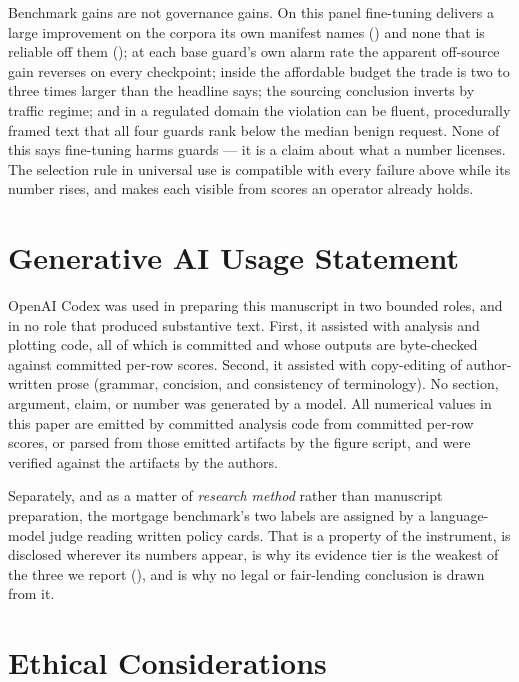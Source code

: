 \documentclass[manuscript,screen,review,anonymous]{acmart}
\begin{document}
Benchmark gains are not governance gains. On this panel fine-tuning delivers a large improvement on the
corpora its own manifest names (\RepDelta) and none that is reliable off them (\TransferDelta); at each
base guard's own alarm rate the apparent off-source gain reverses on every checkpoint; inside the
affordable budget the trade is two to three times larger than the headline says; the sourcing conclusion
inverts by traffic regime; and in a regulated domain the violation can be fluent, procedurally framed
text that all four guards rank below the median benign request. None of this says fine-tuning harms
guards --- it is a claim about what a number licenses. The selection rule in universal use is compatible
with every failure above while its number rises, and  makes each visible from scores
an operator already holds.

\clearpage
\section*{Generative AI Usage Statement}

OpenAI Codex was used in preparing this manuscript in two bounded roles, and in no role that produced
substantive text. First, it assisted with analysis and plotting code, all of which is committed and whose
outputs are byte-checked against committed per-row scores. Second, it assisted with copy-editing of
author-written prose (grammar, concision, and consistency of terminology). No section, argument, claim,
or number was generated by a model. All numerical values in this paper are emitted by
committed analysis code from committed per-row scores, or parsed from those emitted artifacts by the
figure script, and were verified against the artifacts by the authors.

Separately, and as a matter of \emph{research method} rather than manuscript preparation, the mortgage
benchmark's two labels are assigned by a language-model judge reading written policy cards. That is a
property of the instrument, is disclosed wherever its numbers appear, is why its evidence tier is the
weakest of the three we report (), and is why no legal or fair-lending conclusion is
drawn from it.

\section*{Ethical Considerations}
\end{document}
